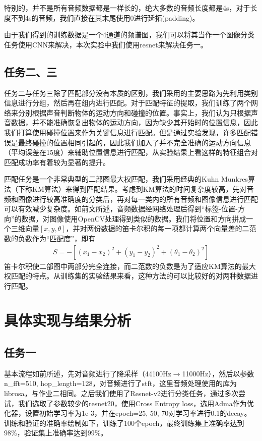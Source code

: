 \documentclass[a4paper]{ctexart}
\begin{document}
特别的，并不是所有音频数据都是一样长的，绝大多数的音频长度都是4s，对于长度不到4s的音频，我们直接在其末尾使用0进行延拓(padding)。

由于我们得到的训练数据是一个4通道的频谱图，我们可以将其当作一个图像分类任务使用CNN来解决，本次实验中我们使用resnet来解决任务一。
\subsection{任务二、三}
任务二与任务三除了匹配部分没有本质的区别，我们采用的主要思路为先利用类别信息进行分组，然后再在组内进行匹配。对于匹配特征的提取，我们训练了两个网络来分别根据声音判断物体的运动方向和碰撞的位置。事实上，我们认为只根据声音数据，并不能准确恢复出物体的运动方向，因为缺少其开始时的位置信息，因此我们打算使用碰撞位置来作为关键信息进行匹配。但是通过实验发现，许多匹配错误是最终碰撞的位置相同引起的，因此我们加入了并不完全准确的运动方向信息（平均误差在15度）来辅助位置信息进行匹配，从实验结果上看这样的特征组合对匹配成功率有着较为显著的提升。

匹配任务是一个非常典型的二部图最大权匹配，我们采用经典的Kuhn Munkres算法（下称KM算法）来得到匹配结果。考虑到KM算法的时间复杂度较高，先对音频和图像进行较高准确度的分类后，再对每一类内的所有音频和图像信息进行匹配可以有效减少复杂度。如前文所述，音频数据经网络处理后得到“标签-位置-方向”的数据，对图像使用OpenCV处理得到类似的数据。我们将位置和方向拼成一个三维向量$[x, y, \theta]$，并对两份数据的笛卡尔积的每一项都计算两个向量差的二范数的负数作为“匹配度”，即有
\begin{align*}
    S = - \left[(x_1 - x_2)^2 + (y_1 - y_2)^2 + (\theta_1 - \theta_2)^2  \right]
\end{align*}
笛卡尔积使二部图中两部分完全连接，而二范数的负数是为了适应KM算法的最大权匹配的特点。从训练集的实验结果来看，这种方法的可以比较好的对两种数据进行匹配。

\section{具体实现与结果分析}
\subsection{任务一}
基本流程如前所述，先对音频进行了降采样（44100Hz$\rightarrow$11000Hz），然后以参数n\_fft=510, hop\_length=128，对音频进行了stft，这里音频处理使用的库为librosa，与作业二相同。之后我们使用了Resnet-v2\cite{resnet}进行分类任务，通过多次尝试，我们选取了参数较少的resnet20，使用Cross Entropy loss，选用Adma作为优化器，设置初始学习率为1e-3，并在epoch=25, 50, 70对学习率进行0.1的decay。训练和验证的准确率绘制如下，训练了100个epoch，最终训练集上准确率达到98\%，验证集上准确率达到99\%。
\end{document}
